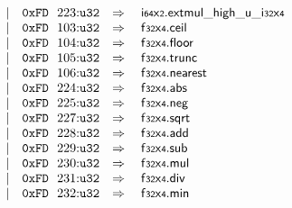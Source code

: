 $$\begin{array}[t]{@{}lrrl@{}l@{}l@{}l@{}}
& & | & \mathtt{0xFD}~~223{:}{\mathtt{u32}} & \quad\Rightarrow\quad{} & {\mathsf{i{\scriptstyle 64}}}{\mathsf{x}}{\mathsf{{\scriptstyle 2}}} {.} {{\mathsf{extmul}}{\mathsf{\_}}{\mathsf{high}}{\mathsf{\_}}{\mathsf{u}}}{\mathsf{\_}}{{\mathsf{i{\scriptstyle 32}}}{\mathsf{x}}{\mathsf{{\scriptstyle 4}}}} \\
& & | & \mathtt{0xFD}~~103{:}{\mathtt{u32}} & \quad\Rightarrow\quad{} & {\mathsf{f{\scriptstyle 32}}}{\mathsf{x}}{\mathsf{{\scriptstyle 4}}} {.} \mathsf{ceil} \\
& & | & \mathtt{0xFD}~~104{:}{\mathtt{u32}} & \quad\Rightarrow\quad{} & {\mathsf{f{\scriptstyle 32}}}{\mathsf{x}}{\mathsf{{\scriptstyle 4}}} {.} \mathsf{floor} \\
& & | & \mathtt{0xFD}~~105{:}{\mathtt{u32}} & \quad\Rightarrow\quad{} & {\mathsf{f{\scriptstyle 32}}}{\mathsf{x}}{\mathsf{{\scriptstyle 4}}} {.} \mathsf{trunc} \\
& & | & \mathtt{0xFD}~~106{:}{\mathtt{u32}} & \quad\Rightarrow\quad{} & {\mathsf{f{\scriptstyle 32}}}{\mathsf{x}}{\mathsf{{\scriptstyle 4}}} {.} \mathsf{nearest} \\
& & | & \mathtt{0xFD}~~224{:}{\mathtt{u32}} & \quad\Rightarrow\quad{} & {\mathsf{f{\scriptstyle 32}}}{\mathsf{x}}{\mathsf{{\scriptstyle 4}}} {.} \mathsf{abs} \\
& & | & \mathtt{0xFD}~~225{:}{\mathtt{u32}} & \quad\Rightarrow\quad{} & {\mathsf{f{\scriptstyle 32}}}{\mathsf{x}}{\mathsf{{\scriptstyle 4}}} {.} \mathsf{neg} \\
& & | & \mathtt{0xFD}~~227{:}{\mathtt{u32}} & \quad\Rightarrow\quad{} & {\mathsf{f{\scriptstyle 32}}}{\mathsf{x}}{\mathsf{{\scriptstyle 4}}} {.} \mathsf{sqrt} \\
& & | & \mathtt{0xFD}~~228{:}{\mathtt{u32}} & \quad\Rightarrow\quad{} & {\mathsf{f{\scriptstyle 32}}}{\mathsf{x}}{\mathsf{{\scriptstyle 4}}} {.} \mathsf{add} \\
& & | & \mathtt{0xFD}~~229{:}{\mathtt{u32}} & \quad\Rightarrow\quad{} & {\mathsf{f{\scriptstyle 32}}}{\mathsf{x}}{\mathsf{{\scriptstyle 4}}} {.} \mathsf{sub} \\
& & | & \mathtt{0xFD}~~230{:}{\mathtt{u32}} & \quad\Rightarrow\quad{} & {\mathsf{f{\scriptstyle 32}}}{\mathsf{x}}{\mathsf{{\scriptstyle 4}}} {.} \mathsf{mul} \\
& & | & \mathtt{0xFD}~~231{:}{\mathtt{u32}} & \quad\Rightarrow\quad{} & {\mathsf{f{\scriptstyle 32}}}{\mathsf{x}}{\mathsf{{\scriptstyle 4}}} {.} \mathsf{div} \\
& & | & \mathtt{0xFD}~~232{:}{\mathtt{u32}} & \quad\Rightarrow\quad{} & {\mathsf{f{\scriptstyle 32}}}{\mathsf{x}}{\mathsf{{\scriptstyle 4}}} {.} \mathsf{min} \\

\end{array}$$
